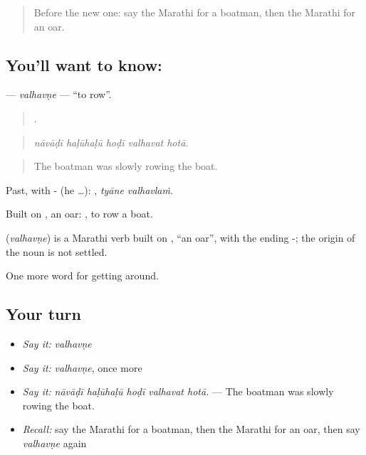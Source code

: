 \begin{quote}
Before the new one: say the Marathi for a boatman, then the Marathi for an oar.
\end{quote}

\subsection*{You'll want to know: }
\textbf{} — \emph{valhavṇe} — \textquotedblleft{}to row\textquotedblright{}.

\begin{quote}
    .
\end{quote}

\begin{quote}
\emph{nāvāḍī haḷūhaḷū hoḍī valhavat hotā.}
\end{quote}

\begin{quote}
The boatman was slowly rowing the boat.
\end{quote}

Past, with - (he …):  , \emph{tyāne valhavlaṁ}.

Built on , an oar:  , to row a boat.

\begin{cousinweb}
\textbf{} (\emph{valhavṇe}) is a Marathi verb built on \textbf{}, \textquotedblleft{}an oar\textquotedblright{}, with the ending -; the origin of the noun is not settled.
\end{cousinweb}

\begin{grammarlens}[title={What you've built}]
One more word for getting around.
\end{grammarlens}

\subsection*{Your turn}
\begin{itemize}
\raggedright
  \item \emph{Say it:} \emph{valhavṇe}
  \item \emph{Say it:} \emph{valhavṇe}, once more
  \item \emph{Say it:} \emph{nāvāḍī haḷūhaḷū hoḍī valhavat hotā.} — The boatman was slowly rowing the boat.
  \item \emph{Recall:} say the Marathi for a boatman, then the Marathi for an oar, then say \emph{valhavṇe} again
\end{itemize}

